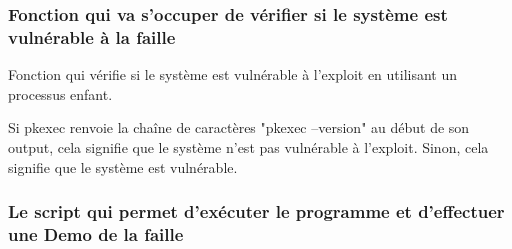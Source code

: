 \documentclass[12pt,a4paper]{article}
\begin{document}
            \subsubsection{Fonction qui va s'occuper de vérifier si le système est vulnérable à la faille}
              
            \begin{flushleft}
                \noindent Fonction qui vérifie si le système est vulnérable à l'exploit en utilisant un processus enfant.
                \item Si pkexec renvoie la chaîne de caractères "pkexec --version" au début de son output, cela signifie que le système n'est pas vulnérable à l'exploit. Sinon, cela signifie que le système est vulnérable.
            \end{flushleft}
            
            \newpage
			\subsubsection{Le script qui permet d'exécuter le programme et d'effectuer une Demo de la faille} 
			  
   
\end{document}

